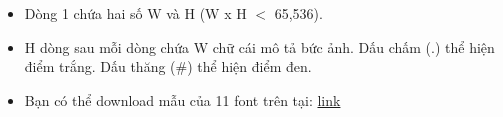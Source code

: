 \begin{itemize}
	\item 

     Dòng  1 chứa hai số W và H (W x H $<$ 65,536).    
	\item 

     H dòng sau mỗi dòng chứa W chữ cái mô tả bức ảnh. Dấu  chấm (.) thể hiện điểm trắng. Dấu thăng (\#) thể hiện điểm đen.    
	\item 

     Bạn có thể download mẫu của 11 font trên tại:     \href{../../../content/voj:VMVSOS.zip}{      link     }
\end{itemize}